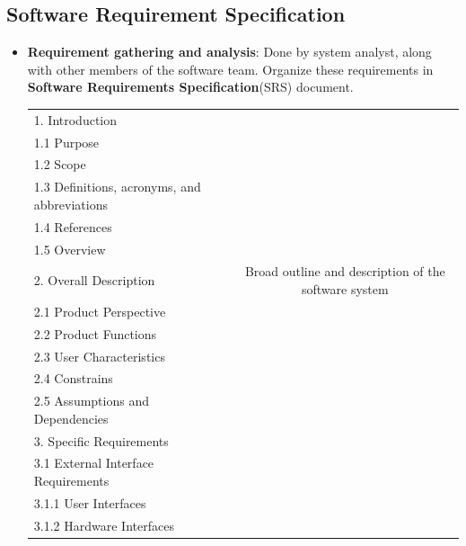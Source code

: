 \documentclass[a4paper]{article}
\begin{document}
\subsection{Software Requirement Specification}
\begin{itemize}
    \item \textbf{Requirement gathering and analysis}: Done by system analyst, along with other members of the software team. Organize these requirements in \textbf{Software Requirements Specification}(SRS) document.
    \begin{table}[H]
        \centering
        \begin{tabular}{|l|c|}
            \hline
            1. Introduction &  \\
            \hspace{1em}1.1 Purpose & \\
            \hspace{1em}1.2 Scope & \\
            \hspace{1em}1.3 Definitions, acronyms, and abbreviations & \\
            \hspace{1em}1.4 References & \\
            \hspace{1em}1.5 Overview & \\
            2. Overall Description & Broad outline and description of the software system\\
            \hspace{1em}2.1 Product Perspective & \\
            \hspace{1em}2.2 Product Functions & \\
            \hspace{1em}2.3 User Characteristics & \\
            \hspace{1em}2.4 Constrains & \\
            \hspace{1em}2.5 Assumptions and Dependencies & \\
            \hline
            3. Specific Requirements & \\
            \hspace{1em}3.1 External Interface Requirements & \\
            \hspace{2em}3.1.1 User Interfaces & \\
            \hspace{2em}3.1.2 Hardware Interfaces & \\

\end{tabular}
\end{table}
\end{itemize}
\end{document}
